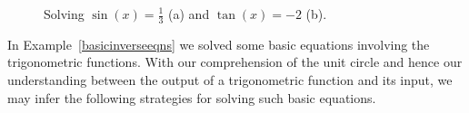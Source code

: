 \begin{example}
\begin{enumerate}
\end{enumerate}

\begin{figure}[H]
			\centering
\centerline{
\hspace{0.1cm}
}
	\caption{Solving $\sin(x) = \frac{1}{3}$ (a) and  $\tan(x)=-2$ (b).}
\end{figure}


\end{example}

\ifcourse \pagebreak \fi

In Example~\ref{basicinverseeqns} we solved some basic equations involving the trigonometric functions. With our comprehension of the unit circle and hence our understanding between the output of a trigonometric function and its input, we may infer the following strategies for solving such basic equations.

